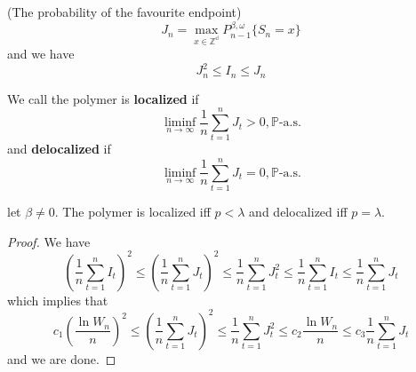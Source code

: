 \begin{definition}
    (The probability of the favourite endpoint)
    \[
    J_n = \max_{x\in\mathbb{Z^d}}P_{n-1}^{\beta,\omega}\{S_n = x\}
    \]
    and we have
    \[
    J_n^2 \leq I_n \leq J_n
    \]
\end{definition}

\begin{definition}
    We call the polymer is \textbf{localized} if
    \[
    \liminf_{n\to\infty}\dfrac{1}{n}\sum\limits_{t=1}^n J_t > 0,\mathbb{P}\text{-a.s.}
    \]
    and \textbf{delocalized} if
    \[
    \liminf_{n\to\infty}\dfrac{1}{n}\sum\limits_{t=1}^n J_t = 0,\mathbb{P}\text{-a.s.}
    \]
\end{definition}

\begin{theorem}
    let $\beta \neq 0$. The polymer is localized iff $p<\lambda$ and delocalized iff $p=\lambda$.
\end{theorem}
\begin{proof}
    We have
    \[
    \left(\dfrac{1}{n}\sum\limits_{t=1}^n I_t\right)^2 \leq \left(\dfrac{1}{n}\sum\limits_{t=1}^n J_t\right)^2 \leq \dfrac{1}{n}\sum\limits_{t=1}^n J_t^2 \leq \dfrac{1}{n}\sum\limits_{t=1}^n I_t \leq \dfrac{1}{n}\sum\limits_{t=1}^n J_t
    \]
    which implies that
    \[
    c_1\left(\dfrac{\ln W_n}{n}\right)^2 \leq \left(\dfrac{1}{n}\sum\limits_{t=1}^n J_t\right)^2 \leq \dfrac{1}{n}\sum\limits_{t=1}^n J_t^2 \leq c_2 \dfrac{\ln W_n}{n} \leq c_3 \dfrac{1}{n}\sum\limits_{t=1}^n J_t
    \]
    and we are done.
\end{proof}

